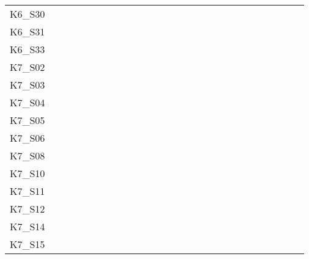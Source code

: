 \begin{table}[htpb]
\begin{tabular}{l|rrrrrrrrrrrrrrrrrrrrrrrrrr}
        K6\_S30 & \n & \n & \n & \n & \n & \n & \n & \n & \n & \n & \n & \n & \n & \n & \n & \n & \n & \n & \n & \n & \e & \e & \n & \n & \n & \n \\
        K6\_S31 & \n & \n & \n & \n & \n & \n & \n & \n & \n & \n & \n & \n & \n & \n & \n & \n & \n & \n & \n & \n & \n & \n & \n & \n & \n & \n \\
        K6\_S33 & \n & \n & \n & \n & \n & \n & \n & \n & \n & \n & \n & \n & \n & \n & \n & \n & \n & \n & \n & \n & \n & \n & \n & \n & \n & \n \\
        K7\_S02 & \n & \n & \n & \n & \n & \n & \n & \n & \n & \n & \n & \n & \n & \n & \n & \n & \n & \n & \n & \n & \n & \n & \n & \n & \n & \n \\
        K7\_S03 & \n & \n & \n & \n & \n & \n & \n & \n & \n & \n & \n & \n & \n & \e & \n & \n & \n & \n & \n & \e & \n & \n & \n & \n & \n & \n \\
        K7\_S04 & \n & \n & \n & \e & \e & \n & \n & \n & \n & \n & \n & \n & \n & \n & \n & \n & \n & \n & \n & \n & \n & \n & \n & \n & \n & \n \\
        K7\_S05 & \n & \n & \n & \n & \n & \n & \n & \n & \n & \n & \n & \n & \n & \n & \n & \n & \n & \n & \n & \n & \n & \e & \n & \n & \e & \n \\
        K7\_S06 & \n & \n & \n & \n & \n & \n & \n & \n & \n & \n & \n & \n & \n & \n & \n & \n & \n & \n & \n & \n & \n & \n & \n & \n & \n & \n \\
        K7\_S08 & \n & \n & \n & \n & \n & \n & \n & \n & \n & \n & \n & \n & \n & \n & \n & \n & \n & \n & \n & \n & \e & \e & \n & \n & \e & \n \\
        K7\_S10 & \n & \n & \n & \n & \e & \n & \n & \n & \n & \n & \n & \n & \n & \n & \n & \n & \n & \n & \n & \e & \n & \n & \n & \n & \n & \n \\
        K7\_S11 & \n & \n & \n & \n & \n & \n & \n & \n & \n & \n & \n & \n & \n & \n & \n & \n & \n & \n & \n & \n & \n & \n & \n & \n & \n & \n \\
        K7\_S12 & \n & \n & \n & \n & \e & \n & \n & \n & \n & \n & \n & \n & \n & \n & \n & \n & \n & \n & \n & \n & \e & \e & \n & \e & \e & \n \\
        K7\_S14 & \n & \n & \n & \n & \n & \n & \n & \n & \n & \n & \n & \n & \n & \n & \n & \n & \n & \n & \n & \n & \e & \e & \n & \n & \n & \n \\
        K7\_S15 & \n & \n & \n & \n & \n & \n & \n & \n & \n & \n & \n & \n & \n & \e & \n & \n & \n & \n & \e & \e & \n & \n & \n & \n & \e & \n \\

\end{tabular}
\end{table}
